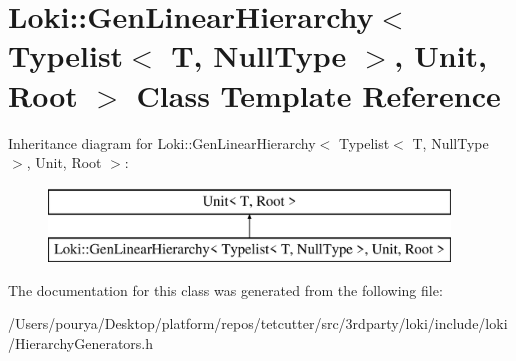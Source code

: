 \hypertarget{classLoki_1_1GenLinearHierarchy_3_01Typelist_3_01T_00_01NullType_01_4_00_01Unit_00_01Root_01_4}{}\section{Loki\+:\+:Gen\+Linear\+Hierarchy$<$ Typelist$<$ T, Null\+Type $>$, Unit, Root $>$ Class Template Reference}
\label{classLoki_1_1GenLinearHierarchy_3_01Typelist_3_01T_00_01NullType_01_4_00_01Unit_00_01Root_01_4}
Inheritance diagram for Loki\+:\+:Gen\+Linear\+Hierarchy$<$ Typelist$<$ T, Null\+Type $>$, Unit, Root $>$\+:\begin{figure}[H]
\begin{center}
\leavevmode
\includegraphics[height=2.000000cm]{classLoki_1_1GenLinearHierarchy_3_01Typelist_3_01T_00_01NullType_01_4_00_01Unit_00_01Root_01_4}
\end{center}
\end{figure}


The documentation for this class was generated from the following file\+:\begin{DoxyCompactItemize}
\item 
/\+Users/pourya/\+Desktop/platform/repos/tetcutter/src/3rdparty/loki/include/loki/Hierarchy\+Generators.\+h\end{DoxyCompactItemize}
